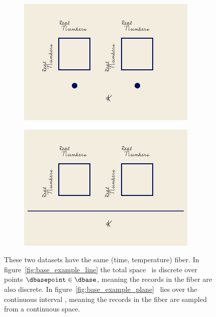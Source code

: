 \documentclass[../main.tex]{subfiles}
\begin{document}
\begin{figure}[ht!]
    \begin{subfigure}{.5\textwidth}
        \includegraphics[width=\textwidth]{figures/math/temp_1k.png}
        \caption{}
        \label{fig:base_example_discrete}
    \end{subfigure}
    \begin{subfigure}{.5\textwidth}
        \includegraphics[width=\textwidth]{figures/math/temp_2f.png}
        \caption{}
        \label{fig:base_example_continuous}
    \end{subfigure}
    \caption{These two datasets have the same (time, temperature) fiber. In figure~\ref{fig:base_example_line} the total space \dtotal\ is discrete over points $\dbasepoint \in \dbase$, meaning the records in the fiber are also discrete. In figure~\ref{fig:base_example_plane} \dtotal\ lies over the continuous interval \dbase, meaning the records in the fiber are sampled from a continuous space.} 
    \label{fig:base_example}
\end{figure}
\end{document}
